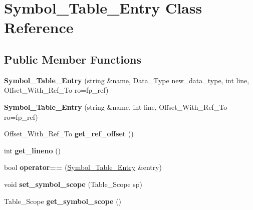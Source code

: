 \hypertarget{classSymbol__Table__Entry}{}\section{Symbol\+\_\+\+Table\+\_\+\+Entry Class Reference}
\label{classSymbol__Table__Entry}
\subsection*{Public Member Functions}
\begin{DoxyCompactItemize}
\item 
\mbox{\label{classSymbol__Table__Entry_a396db67d6ddd405be92f98ce0954e071}} 
{\bfseries Symbol\+\_\+\+Table\+\_\+\+Entry} (string \&name, Data\+\_\+\+Type new\+\_\+data\+\_\+type, int line, Offset\+\_\+\+With\+\_\+\+Ref\+\_\+\+To ro=fp\+\_\+ref)
\item 
\mbox{\label{classSymbol__Table__Entry_a8ef97f08bdf049291a69098050fbc34c}} 
{\bfseries Symbol\+\_\+\+Table\+\_\+\+Entry} (string \&name, int line, Offset\+\_\+\+With\+\_\+\+Ref\+\_\+\+To ro=fp\+\_\+ref)
\item 
\mbox{\label{classSymbol__Table__Entry_a24b138a26d7e5af6b11744d252dd0963}} 
Offset\+\_\+\+With\+\_\+\+Ref\+\_\+\+To {\bfseries get\+\_\+ref\+\_\+offset} ()
\item 
\mbox{\label{classSymbol__Table__Entry_a47005f077e5801fee64d3c2e875fb4f6}} 
int {\bfseries get\+\_\+lineno} ()
\item 
\mbox{\label{classSymbol__Table__Entry_a6cf722ccab1f891640f652476bc7ec01}} 
bool {\bfseries operator==} (\hyperlink{classSymbol__Table__Entry}{Symbol\+\_\+\+Table\+\_\+\+Entry} \&entry)
\item 
\mbox{\label{classSymbol__Table__Entry_adf42749f76df22f82ffcfd128e63bac3}} 
void {\bfseries set\+\_\+symbol\+\_\+scope} (Table\+\_\+\+Scope sp)
\item 
\mbox{\label{classSymbol__Table__Entry_a4a52f3652ac14f62009de369c38c67ac}} 
Table\+\_\+\+Scope {\bfseries get\+\_\+symbol\+\_\+scope} ()

\end{DoxyCompactItemize}

